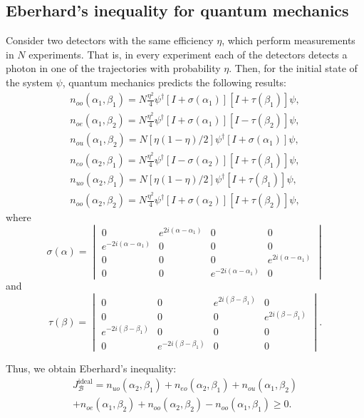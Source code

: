 \documentclass[%
master,         %
subf,           %
href,           %
colorlinks=true %
]{disser}
\numberwithin{equation}{section}
\numberwithin{figure}{section}
\begin{document}
\subsection{Eberhard's inequality for quantum mechanics}
Consider two detectors with the same efficiency $\eta$, which perform measurements in $N$ experiments. That is, in every experiment each of the detectors detects a photon in one of the trajectories with probability $\eta$. Then, for the initial state of the system $\psi$, quantum mechanics predicts the following results:
\begin{eqnarray} \label{eq:Eberhard_n_start}
n_{oo}(\alpha_1, \beta_1) = N\frac{\eta^2}{4}\psi^\dagger[I + \sigma(\alpha_1)][I + \tau(\beta_1)]\psi,\\
n_{oe}(\alpha_1, \beta_2) = N\frac{\eta^2}{4}\psi^\dagger[I + \sigma(\alpha_1)][I - \tau(\beta_2)]\psi,\\
n_{ou}(\alpha_1, \beta_2) = N[\eta(1 - \eta)/2]\psi^\dagger[I + \sigma(\alpha_1)]\psi,\\ \label{eq:Eberhard_n_ou}
n_{eo}(\alpha_2, \beta_1) = N\frac{\eta^2}{4}\psi^\dagger[I - \sigma(\alpha_2)][I + \tau(\beta_1)]\psi,\\
n_{uo}(\alpha_2, \beta_1) = N[\eta(1 - \eta)/2]\psi^\dagger[I + \tau(\beta_1)]\psi,\\ \label{eq:Eberhard_n_uo}
n_{oo}(\alpha_2, \beta_2) = N\frac{\eta^2}{4}\psi^\dagger[I + \sigma(\alpha_2)][I + \tau(\beta_2)]\psi, \label{eq:Eberhard_n_finish}
\end{eqnarray}
where 
\[
\sigma(\alpha) = 
\begin{vmatrix}
0 & e^{2i(\alpha - \alpha_1)} & 0 & 0\\
e^{-2i(\alpha - \alpha_1)} & 0 & 0 & 0\\
0 & 0 & 0 & e^{2i(\alpha - \alpha_1)}\\
0 & 0 & e^{-2i(\alpha - \alpha_1)} & 0
\end{vmatrix}
\] 
and
\[
\tau(\beta) = 
\begin{vmatrix}
0 & 0 & e^{2i(\beta - \beta_1)} & 0\\
0 & 0 & 0 & e^{2i(\beta - \beta_1)}\\
e^{-2i(\beta - \beta_1)} & 0 & 0 & 0\\
0 & e^{-2i(\beta - \beta_1)} & 0 & 0
\end{vmatrix}.
\]

Thus, we obtain Eberhard's inequality:
\begin{multline*}
J_{\mathcal{B}}^{\mbox{ideal}} = n_{uo}(\alpha_2, \beta_1) + n_{eo}(\alpha_2, \beta_1) + n_{ou}(\alpha_1, \beta_2) \\
+ n_{oe}(\alpha_1, \beta_2) + n_{oo}(\alpha_2, \beta_2) - n_{oo}(\alpha_1, \beta_1) \geq 0.
\end{multline*}
\end{document}
